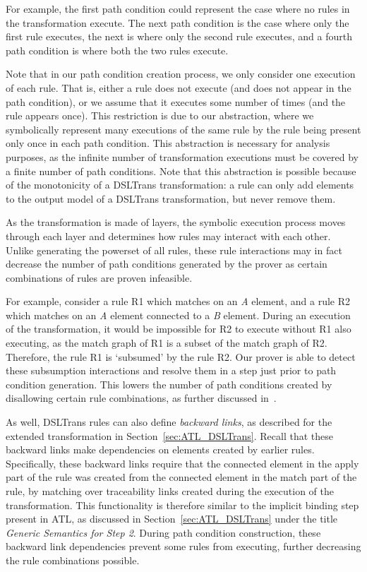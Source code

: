 For example, the first path
condition could represent the case where no rules in the transformation execute.
The next path condition is the case where only the first rule executes, the next
is where only the second rule executes, and a fourth path condition is where
both the two rules execute.

Note that in our path condition creation process, we
only consider one execution of each rule. That is, either a rule does not
execute (and does not appear in the path condition), or we assume that it executes some number of times (and the rule appears once). This restriction is due to our abstraction, where we symbolically represent
many executions of the same rule by the rule being present only once in each path
condition. This abstraction is necessary for analysis purposes, as the infinite number of transformation executions must be covered by a finite number of path conditions. Note that this abstraction is possible because of the
monotonicity of a DSLTrans transformation: a rule can only add elements to the
output model of a DSLTrans transformation, but never remove them.

As the transformation is made of layers, the symbolic execution process moves
through each layer and determines how rules may interact with each other. Unlike generating the powerset of all rules, these
rule interactions may in fact decrease the number of path conditions generated
by the prover as certain combinations of rules are proven infeasible.

For example, consider a rule R1 which matches on an \textit{A} element, and a
rule R2 which matches on an \textit{A} element connected to a \textit{B}
element. During an execution of the transformation, it would be impossible for R2 to execute without R1 also executing, as the match graph of R1 is a subset of the match graph of R2. Therefore, the rule R1 is `subsumed' by the rule R2. Our prover is able to detect these subsumption interactions and resolve them in a step just prior to path condition generation. This lowers the number of path conditions created by disallowing certain rule combinations, as further discussed in~\cite{Selim2014}.

As well, DSLTrans rules can also define \textit{backward links}, as described for the extended \FTP transformation in Section~\ref{sec:ATL_DSLTrans}. Recall that these backward links make dependencies on elements created by earlier rules. Specifically, these backward links require that the connected element in the
apply part of the rule was created from the connected element in the match part of the rule, by matching over traceability links created during the execution of the transformation. This functionality is therefore similar to the implicit binding step present in ATL, as discussed in Section~\ref{sec:ATL_DSLTrans} under the title \textit{Generic Semantics for Step 2}. During path condition construction, these backward link dependencies prevent some rules from executing, further decreasing the rule combinations possible.






 